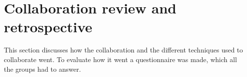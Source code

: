 \section{Collaboration review and retrospective}\label{sec:coopreview}
\commondisclaimer

This section discusses how the collaboration and the different techniques used to collaborate went.
To evaluate how it went a questionnaire was made, which all the groups had to answer.





